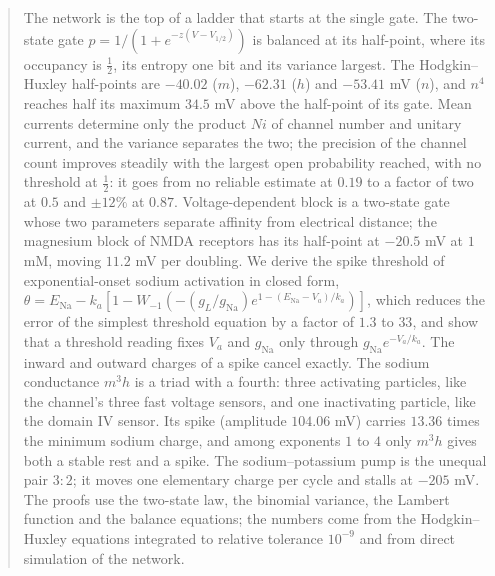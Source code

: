 \documentclass[11pt]{article}
\theoremstyle{definition}\newtheorem{definition}[theorem]{Definition}
\theoremstyle{remark}\newtheorem{remark}[theorem]{Remark}
\begin{document}
\begin{abstract}
The network is the top of a ladder that starts at the single gate. The two-state gate $p=1/(1+e^{-z(V-V_{1/2})})$ is balanced at its half-point, where its occupancy is $\frac12$, its entropy one bit and its variance largest. The Hodgkin--Huxley half-points are $-40.02$ ($m$), $-62.31$ ($h$) and $-53.41$ mV ($n$), and $n^4$ reaches half its maximum $34.5$ mV above the half-point of its gate. Mean currents determine only the product $Ni$ of channel number and unitary current, and the variance separates the two; the precision of the channel count improves steadily with the largest open probability reached, with no threshold at $\frac12$: it goes from no reliable estimate at $0.19$ to a factor of two at $0.5$ and $\pm12\%$ at $0.87$. Voltage-dependent block is a two-state gate whose two parameters separate affinity from electrical distance; the magnesium block of NMDA receptors has its half-point at $-20.5$ mV at $1$ mM, moving $11.2$ mV per doubling. We derive the spike threshold of exponential-onset sodium activation in closed form, $\theta=E_{\mathrm{Na}}-k_a[1-W_{-1}(-(g_L/g_{\mathrm{Na}})e^{1-(E_{\mathrm{Na}}-V_a)/k_a})]$, which reduces the error of the simplest threshold equation by a factor of $1.3$ to $33$, and show that a threshold reading fixes $V_a$ and $g_{\mathrm{Na}}$ only through $g_{\mathrm{Na}}e^{-V_a/k_a}$. The inward and outward charges of a spike cancel exactly. The sodium conductance $m^3h$ is a triad with a fourth: three activating particles, like the channel's three fast voltage sensors, and one inactivating particle, like the domain IV sensor. Its spike (amplitude $104.06$ mV) carries $13.36$ times the minimum sodium charge, and among exponents $1$ to $4$ only $m^3h$ gives both a stable rest and a spike. The sodium--potassium pump is the unequal pair $3{:}2$; it moves one elementary charge per cycle and stalls at $-205$ mV. The proofs use the two-state law, the binomial variance, the Lambert function and the balance equations; the numbers come from the Hodgkin--Huxley equations integrated to relative tolerance $10^{-9}$ and from direct simulation of the network.
\end{abstract}
\end{document}
